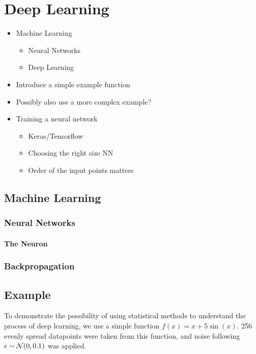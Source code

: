 
\chapter{Deep Learning}

\begin{itemize}
    \item Machine Learning
    \begin{itemize}
        \item Neural Networks
        \item Deep Learning
    \end{itemize}
    \item Introduce a simple example function
	\item Possibly also use a more complex example?
	\item Training a neural network
	      \begin{itemize}
		      \item Keras/Tensorflow
		      \item Choosing the right size NN
		      \item Order of the input points matters
	      \end{itemize}
\end{itemize}

\section{Machine Learning}

\subsection{Neural Networks}

\subsubsection{The Neuron}

\subsection{Backpropagation}

\section{Example}

To demonstrate the possibility of using statistical methods to understand the process of deep learning, we use a simple function \(f(x) = x + 5 \sin(x)\).
256 evenly spread datapoints were taken from this function, and noise following \(\epsilon \sim \mathcal{N}(0, 0.1)\) was applied.

